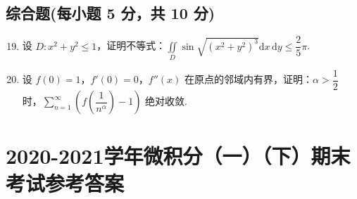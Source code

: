 \documentclass[../main.tex]{subfiles}
\begin{document}
\section{综合题(每小题 5 分，共 10 分)}

\begin{enumerate}
    \setcounter{enumi}{18}
    \item 设 \( D: x^2 + y^2 \leq 1 \)，证明不等式：\( \displaystyle \iint \limits_D \sin \sqrt{(x^2 + y^2)^3} \mathrm{d}x\,\mathrm{d}y \leq \dfrac{2}{5}\pi \).
          \vspace{10em}

    \item 设 \( f(0) = 1 \)，\( f'(0) = 0 \)，\( f''(x) \) 在原点的邻域内有界，证明：\( \alpha > \dfrac{1}{2} \) 时，\( \sum \limits_{n=1}^{\infty} \left( f\left( \dfrac{1}{n^\alpha} \right) - 1 \right) \) 绝对收敛.
          \vspace{10em}
\end{enumerate}
\chapter{2020-2021学年微积分（一）（下）期末考试参考答案}
\end{document}
